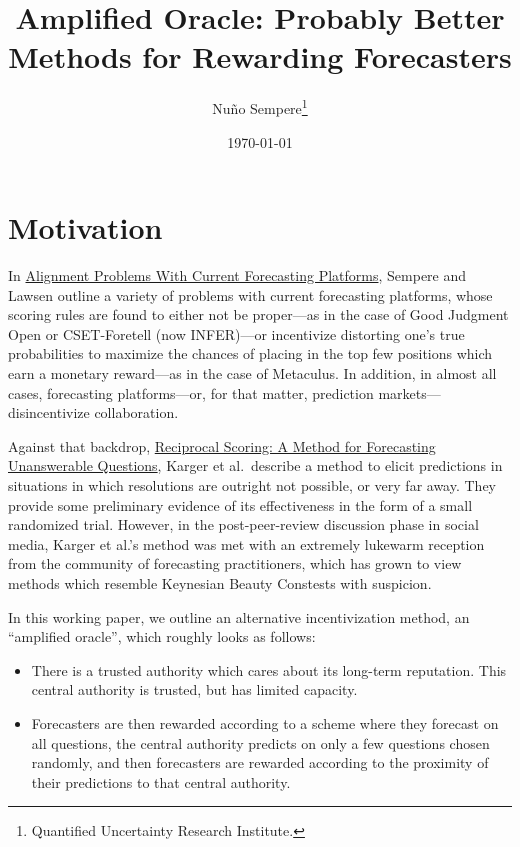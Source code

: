 \documentclass[]{article}
\title{Amplified Oracle: Probably Better Methods for Rewarding Forecasters}
\author{Nuño Sempere\footnote{Quantified Uncertainty Research Institute.}}
\date{\today}
\providecommand{\tightlist}{%
  \setlength{\itemsep}{0pt}\setlength{\parskip}{0pt}}
\begin{document}
\maketitle

\hypertarget{motivation}{%
\section{Motivation}\label{motivation}}

In \href{https://arxiv.org/abs/2106.11248}{Alignment Problems With
Current Forecasting Platforms}, Sempere and Lawsen outline a variety of
problems with current forecasting platforms, whose scoring rules are
found to either not be proper---as in the case of Good Judgment Open or
CSET-Foretell (now INFER)---or incentivize distorting one's true
probabilities to maximize the chances of placing in the top few
positions which earn a monetary reward---as in the case of Metaculus. In
addition, in almost all cases, forecasting platforms---or, for that
matter, prediction markets---disincentivize collaboration.

Against that backdrop,
\href{https://papers.ssrn.com/sol3/papers.cfm?abstract_id=3954498}{Reciprocal
Scoring: A Method for Forecasting Unanswerable Questions}, Karger et
al.~describe a method to elicit predictions in situations in which
resolutions are outright not possible, or very far away. They provide
some preliminary evidence of its effectiveness in the form of a small
randomized trial. However, in the post-peer-review discussion phase in
social media, Karger et al.'s method was met with an extremely lukewarm
reception from the community of forecasting practitioners, which has
grown to view methods which resemble Keynesian Beauty Constests with
suspicion.

In this working paper, we outline an alternative incentivization method,
an ``amplified oracle'', which roughly looks as follows:

\begin{itemize}
\tightlist
\item
  There is a trusted authority which cares about its long-term
  reputation. This central authority is trusted, but has limited
  capacity.
\item
  Forecasters are then rewarded according to a scheme where they
  forecast on all questions, the central authority predicts on only a
  few questions chosen randomly, and then forecasters are rewarded
  according to the proximity of their predictions to that central
  authority.
\end{itemize}
\end{document}
